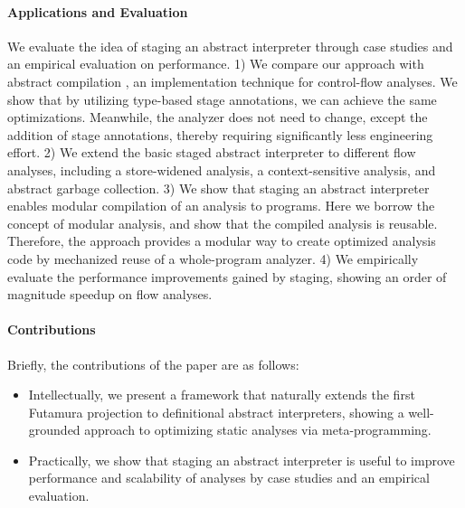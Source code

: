 \paragraph{Applications and Evaluation}
We evaluate the idea of staging an abstract interpreter through
case studies and an empirical evaluation on performance.
1) We compare our approach with abstract compilation
\cite{Boucher:1996:ACN:647473.727587}, an implementation technique for
control-flow analyses. We show that by utilizing type-based stage
annotations, we can achieve the same optimizations. Meanwhile,
the analyzer does not need to change, except the addition of stage annotations,
thereby requiring significantly less engineering effort.
2) We extend the basic staged abstract interpreter to different flow
analyses, including a store-widened analysis, a context-sensitive
analysis, and abstract garbage collection.
3) We show that staging an abstract interpreter enables modular
compilation of an analysis to programs. Here we borrow the concept of
modular analysis, and show that the compiled analysis is reusable.
Therefore, the approach provides a modular way to create optimized
analysis code by mechanized reuse of a whole-program analyzer.
4) We empirically evaluate the performance improvements gained by staging,
showing an order of magnitude speedup on flow analyses.

\paragraph{Contributions} Briefly, the contributions of the paper are as follows:
\begin{itemize}[leftmargin=2em]
  \item Intellectually, we present a framework that naturally extends the first
    Futamura projection to definitional abstract interpreters, showing a
    well-grounded approach to optimizing static analyses via meta-programming.
  \item Practically, we show that staging an abstract interpreter is useful to
    improve performance and scalability of analyses by case studies and an
    empirical evaluation.
\end{itemize}

